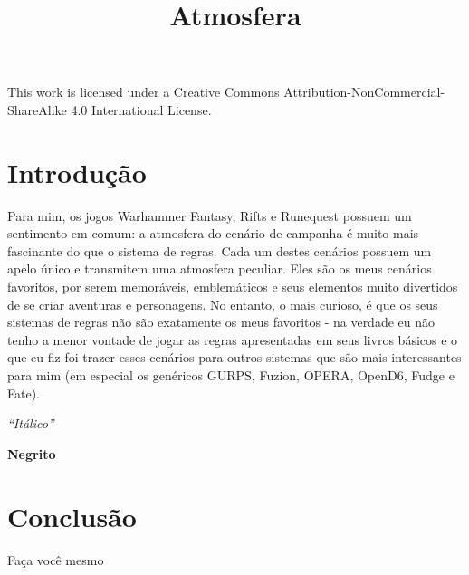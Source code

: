 \documentclass{article}
\begin{document}
This work is licensed under a Creative Commons Attribution-NonCommercial-ShareAlike 4.0 International License.

\title{Atmosfera}

\section{Introdução}

Para mim, os jogos Warhammer Fantasy, Rifts e Runequest possuem um sentimento em comum: a atmosfera do cenário de campanha é muito mais fascinante do que o sistema de regras. Cada um destes cenários possuem um apelo único e transmitem uma atmosfera peculiar. Eles são os meus cenários favoritos, por serem memoráveis, emblemáticos e seus elementos muito divertidos de se criar aventuras e personagens. No entanto, o mais curioso, é que os seus sistemas de regras não são exatamente os meus favoritos - na verdade eu não tenho a menor vontade de jogar as regras apresentadas em seus livros básicos e o que eu fiz foi trazer esses cenários para outros sistemas que são mais interessantes para mim (em especial os genéricos GURPS, Fuzion, OPERA, OpenD6, Fudge e Fate).



\textit{“Itálico”}

\textbf{Negrito}

\section{Conclusão}

Faça você mesmo
\end{document}
